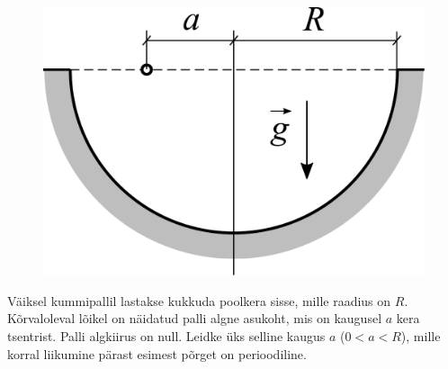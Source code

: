 \documentclass[10pt]{article}
\begin{document}
\begin{figure}
\vspace{-25pt}
  \begin{center}
    \includegraphics[width=\linewidth]{2024-v2g-10-yl.pdf}
  \end{center}
  \vspace{-1cm}
\end{figure}

Väiksel kummipallil lastakse kukkuda poolkera sisse, mille raadius on $R$. Kõrvaloleval lõikel on näidatud palli algne asukoht, mis on kaugusel $a$ kera tsentrist. Palli algkiirus on null. Leidke üks selline kaugus $a$ ($0<a<R$), mille korral liikumine pärast esimest põrget on perioodiline.
\probend
\bigskip

\end{document}
